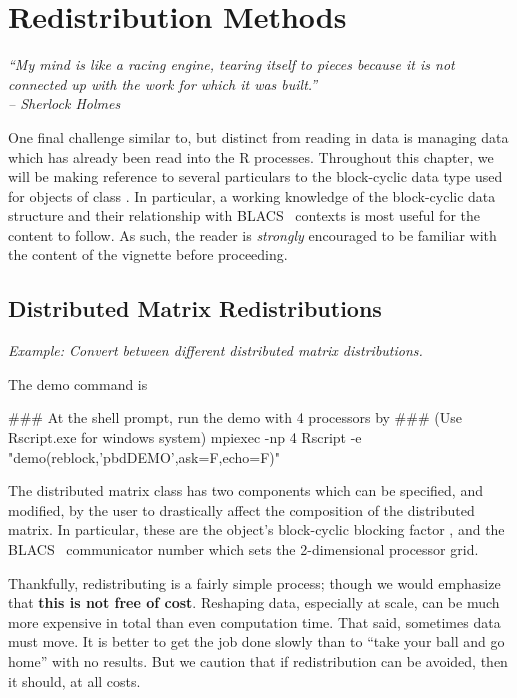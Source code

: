\chapter{Redistribution Methods}
\label{sec:redist}


{\it
``My mind is like a racing engine, tearing itself to pieces because it is not
connected up with the work for which it was built.'' \\
\--- Sherlock Holmes 
}
\vspace{0.5cm}


One final challenge similar to, but distinct from reading in data is managing data which has already been read into the R processes.  Throughout this chapter, we will be making reference to several particulars to the block-cyclic data type used for objects of
class .
In particular, a working knowledge of the block-cyclic data structure and their relationship with BLACS~ contexts is most useful for the content to follow.  As such, the reader is \emph{strongly} encouraged to be familiar with the content of the  vignette before proceeding.

\section{Distributed Matrix Redistributions}
\label{sec:dmatredist}

\emph{Example:  Convert between different distributed matrix distributions.}

The demo command is
\begin{Command}
### At the shell prompt, run the demo with 4 processors by
### (Use Rscript.exe for windows system)
mpiexec -np 4 Rscript -e "demo(reblock,'pbdDEMO',ask=F,echo=F)"
\end{Command}

The distributed matrix class 
has two components which can be specified, and modified, by the user to 
drastically affect the composition of the distributed matrix.  In particular, 
these are the object's block-cyclic blocking factor , and the 
BLACS~ communicator number  which sets the 
2-dimensional processor grid. 

Thankfully, redistributing is a fairly simple process; though we would emphasize 
that \textbf{this is not free of cost}.  Reshaping data, especially at scale, 
can be much more expensive in total than even computation time.  That said, 
sometimes data must move.  It is better to get the job done slowly than to 
``take your ball and go home'' with no results.  But we caution that if 
redistribution can be avoided, then it should, at all costs.

